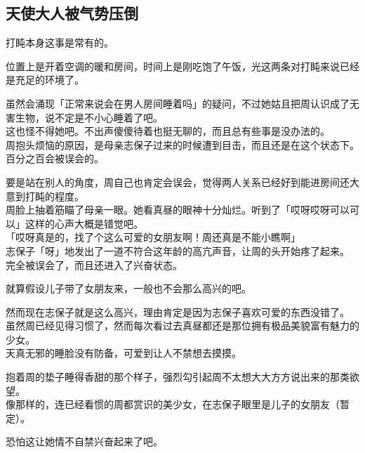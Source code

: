\subsection{天使大人被气势压倒}

打盹本身这事是常有的。

位置上是开着空调的暖和房间，时间上是刚吃饱了午饭，光这两条对打盹来说已经是充足的环境了。

虽然会涌现「正常来说会在男人房间睡着吗」的疑问，不过她姑且把周认识成了无害生物，说不定是不小心睡着了吧。\\

这也怪不得她吧。不出声傻傻待着也挺无聊的，而且总有些事是没办法的。\\

周抱头烦恼的原因，是母亲志保子过来的时候遭到目击，而且还是在这个状态下。\\

百分之百会被误会的。

要是站在别人的角度，周自己也肯定会误会，觉得两人关系已经好到能进房间还大意到打盹的程度。\\

周脸上抽着筋瞄了母亲一眼。她看真昼的眼神十分灿烂。听到了「哎呀哎呀可以可以」这样的心声大概是错觉吧。\\

「哎呀真是的，找了个这么可爱的女朋友啊！周还真是不能小瞧啊」\\

志保子「呀」地发出了一道不符合这年龄的高亢声音，让周的头开始疼了起来。\\

完全被误会了，而且还进入了兴奋状态。

就算假设儿子带了女朋友来，一般也不会那么高兴的吧。

然而现在志保子就是这么高兴，理由肯定是因为志保子喜欢可爱的东西没错了。\\

虽然周已经见得习惯了，然而每次看过去真昼都还是那位拥有极品美貌富有魅力的少女。\\

天真无邪的睡脸没有防备，可爱到让人不禁想去摸摸。

抱着周的垫子睡得香甜的那个样子，强烈勾引起周不太想大大方方说出来的那类欲望。\\

像那样的，连已经看惯的周都赏识的美少女，在志保子眼里是儿子的女朋友（暂定）。

恐怕这让她情不自禁兴奋起来了吧。\\

